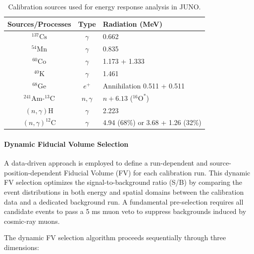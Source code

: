 \begin{table}[h!]
\centering
\caption{Calibration sources used for energy response analysis in JUNO.}
\label{tab:calibration_sources}
\begin{tabular}{ccl}
\toprule
\textbf{Sources/Processes} & \textbf{Type} & \textbf{Radiation (MeV)} \\
\midrule
$^{137}\mathrm{Cs}$ & $\gamma$ & 0.662 \\
$^{54}\mathrm{Mn}$ & $\gamma$ & 0.835 \\
$^{60}\mathrm{Co}$ & $\gamma$ & 1.173 + 1.333 \\
$^{40}\mathrm{K}$ & $\gamma$ & 1.461 \\
$^{68}\mathrm{Ge}$ & $e^{+}$ & Annihilation 0.511 + 0.511 \\
$^{241}\mathrm{Am}$-$^{13}\mathrm{C}$ & $n, \gamma$ & $n + 6.13$ ($^{16}\mathrm{O}^{*}$) \\
$(n,\gamma)\mathrm{H}$ & $\gamma$ & 2.223 \\
$(n,\gamma)^{12}\mathrm{C}$ & $\gamma$ & 4.94 (68\%) or 3.68 + 1.26 (32\%) \\
\bottomrule
\end{tabular}
\end{table}

\paragraph{Dynamic Fiducial Volume Selection}
\label{subsec:fv_selection}

A data-driven approach is employed to define a run-dependent and source-position-dependent Fiducial Volume (FV) for each calibration run. This dynamic FV selection optimizes the signal-to-background ratio (S/B) by comparing the event distributions in both energy and spatial domains between the calibration data and a dedicated background run. A fundamental pre-selection requires all candidate events to pass a 5 ms muon veto to suppress backgrounds induced by cosmic-ray muons.

The dynamic FV selection algorithm proceeds sequentially through three dimensions:

